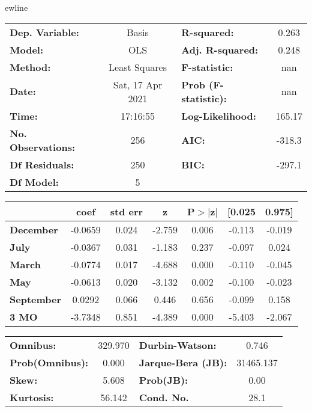 ewline\begin{center}
\begin{tabular}{lclc}
\toprule
\textbf{Dep. Variable:}    &      Basis       & \textbf{  R-squared:         } &     0.263   \\
\textbf{Model:}            &       OLS        & \textbf{  Adj. R-squared:    } &     0.248   \\
\textbf{Method:}           &  Least Squares   & \textbf{  F-statistic:       } &       nan   \\
\textbf{Date:}             & Sat, 17 Apr 2021 & \textbf{  Prob (F-statistic):} &      nan    \\
\textbf{Time:}             &     17:16:55     & \textbf{  Log-Likelihood:    } &    165.17   \\
\textbf{No. Observations:} &         256      & \textbf{  AIC:               } &    -318.3   \\
\textbf{Df Residuals:}     &         250      & \textbf{  BIC:               } &    -297.1   \\
\textbf{Df Model:}         &           5      & \textbf{                     } &             \\
\bottomrule
\end{tabular}
\begin{tabular}{lcccccc}
                   & \textbf{coef} & \textbf{std err} & \textbf{z} & \textbf{P$> |$z$|$} & \textbf{[0.025} & \textbf{0.975]}  \\
\midrule
\textbf{December}  &      -0.0659  &        0.024     &    -2.759  &         0.006        &       -0.113    &       -0.019     \\
\textbf{July}      &      -0.0367  &        0.031     &    -1.183  &         0.237        &       -0.097    &        0.024     \\
\textbf{March}     &      -0.0774  &        0.017     &    -4.688  &         0.000        &       -0.110    &       -0.045     \\
\textbf{May}       &      -0.0613  &        0.020     &    -3.132  &         0.002        &       -0.100    &       -0.023     \\
\textbf{September} &       0.0292  &        0.066     &     0.446  &         0.656        &       -0.099    &        0.158     \\
\textbf{3 MO}      &      -3.7348  &        0.851     &    -4.389  &         0.000        &       -5.403    &       -2.067     \\
\bottomrule
\end{tabular}
\begin{tabular}{lclc}
\textbf{Omnibus:}       & 329.970 & \textbf{  Durbin-Watson:     } &     0.746  \\
\textbf{Prob(Omnibus):} &   0.000 & \textbf{  Jarque-Bera (JB):  } & 31465.137  \\
\textbf{Skew:}          &   5.608 & \textbf{  Prob(JB):          } &      0.00  \\
\textbf{Kurtosis:}      &  56.142 & \textbf{  Cond. No.          } &      28.1  \\
\bottomrule
\end{tabular}
\end{center}


